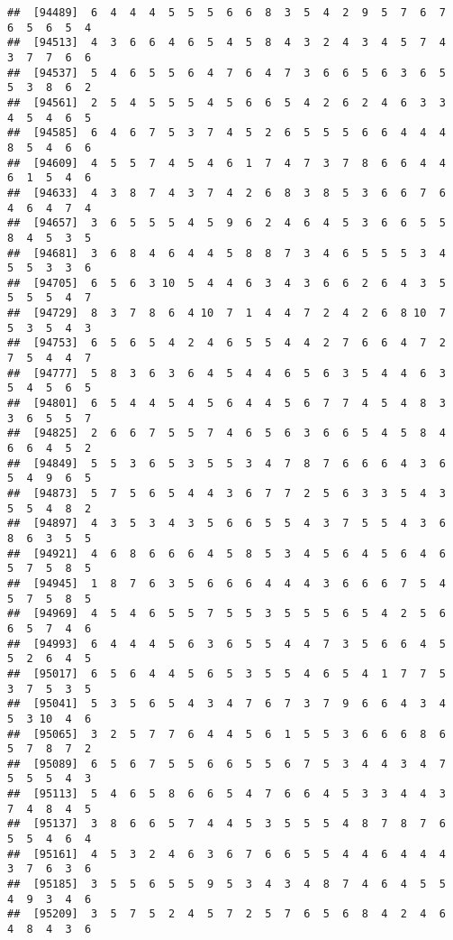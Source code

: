\documentclass[
]{book}
\begin{document}
\begin{verbatim}
##  [94489]  6  4  4  4  5  5  5  6  6  8  3  5  4  2  9  5  7  6  7  6  5  6  5  4
##  [94513]  4  3  6  6  4  6  5  4  5  8  4  3  2  4  3  4  5  7  4  3  7  7  6  6
##  [94537]  5  4  6  5  5  6  4  7  6  4  7  3  6  6  5  6  3  6  5  5  3  8  6  2
##  [94561]  2  5  4  5  5  5  4  5  6  6  5  4  2  6  2  4  6  3  3  4  5  4  6  5
##  [94585]  6  4  6  7  5  3  7  4  5  2  6  5  5  5  6  6  4  4  4  8  5  4  6  6
##  [94609]  4  5  5  7  4  5  4  6  1  7  4  7  3  7  8  6  6  4  4  6  1  5  4  6
##  [94633]  4  3  8  7  4  3  7  4  2  6  8  3  8  5  3  6  6  7  6  4  6  4  7  4
##  [94657]  3  6  5  5  5  4  5  9  6  2  4  6  4  5  3  6  6  5  5  8  4  5  3  5
##  [94681]  3  6  8  4  6  4  4  5  8  8  7  3  4  6  5  5  5  3  4  5  5  3  3  6
##  [94705]  6  5  6  3 10  5  4  4  6  3  4  3  6  6  2  6  4  3  5  5  5  5  4  7
##  [94729]  8  3  7  8  6  4 10  7  1  4  4  7  2  4  2  6  8 10  7  5  3  5  4  3
##  [94753]  6  5  6  5  4  2  4  6  5  5  4  4  2  7  6  6  4  7  2  7  5  4  4  7
##  [94777]  5  8  3  6  3  6  4  5  4  4  6  5  6  3  5  4  4  6  3  5  4  5  6  5
##  [94801]  6  5  4  4  5  4  5  6  4  4  5  6  7  7  4  5  4  8  3  3  6  5  5  7
##  [94825]  2  6  6  7  5  5  7  4  6  5  6  3  6  6  5  4  5  8  4  6  6  4  5  2
##  [94849]  5  5  3  6  5  3  5  5  3  4  7  8  7  6  6  6  4  3  6  5  4  9  6  5
##  [94873]  5  7  5  6  5  4  4  3  6  7  7  2  5  6  3  3  5  4  3  5  5  4  8  2
##  [94897]  4  3  5  3  4  3  5  6  6  5  5  4  3  7  5  5  4  3  6  8  6  3  5  5
##  [94921]  4  6  8  6  6  6  4  5  8  5  3  4  5  6  4  5  6  4  6  5  7  5  8  5
##  [94945]  1  8  7  6  3  5  6  6  6  4  4  4  3  6  6  6  7  5  4  5  7  5  8  5
##  [94969]  4  5  4  6  5  5  7  5  5  3  5  5  5  6  5  4  2  5  6  6  5  7  4  6
##  [94993]  6  4  4  4  5  6  3  6  5  5  4  4  7  3  5  6  6  4  5  5  2  6  4  5
##  [95017]  6  5  6  4  4  5  6  5  3  5  5  4  6  5  4  1  7  7  5  3  7  5  3  5
##  [95041]  5  3  5  6  5  4  3  4  7  6  7  3  7  9  6  6  4  3  4  5  3 10  4  6
##  [95065]  3  2  5  7  7  6  4  4  5  6  1  5  5  3  6  6  6  8  6  5  7  8  7  2
##  [95089]  6  5  6  7  5  5  6  6  5  5  6  7  5  3  4  4  3  4  7  5  5  5  4  3
##  [95113]  5  4  6  5  8  6  6  5  4  7  6  6  4  5  3  3  4  4  3  7  4  8  4  5
##  [95137]  3  8  6  6  5  7  4  4  5  3  5  5  5  4  8  7  8  7  6  5  5  4  6  4
##  [95161]  4  5  3  2  4  6  3  6  7  6  6  5  5  4  4  6  4  4  4  3  7  6  3  6
##  [95185]  3  5  5  6  5  5  9  5  3  4  3  4  8  7  4  6  4  5  5  4  9  3  4  6
##  [95209]  3  5  7  5  2  4  5  7  2  5  7  6  5  6  8  4  2  4  6  4  8  4  3  6

\end{verbatim}
\end{document}
